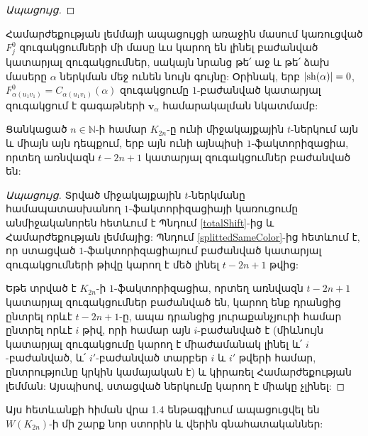 \begin{hide}
\begin{proof}[Ապացույց]
\end{proof}

\begin{remark}\label{splittedSameColor}
Համարժեքության լեմմայի ապացույցի առաջին մասում կառուցված $F_j^0$ զուգակցումների մի մասը ևս կարող են լինել բաժանված կատարյալ զուգակցումներ, սակայն նրանց թե՛ աջ և թե՛ ձախ մասերը $\alpha$ ներկման մեջ ունեն նույն գույնը: Օրինակ, երբ $|{\rm sh}(\alpha)|=0$, $F^0_{\alpha(u_1v_1)} = C_{\alpha(u_1v_1)}(\alpha)$ զուգակցումը $1$-բաժանված կատարյալ զուգակցում է գագաթների $\mathbf{v}_\alpha$ համարակալման նկատմամբ:
\end{remark}
\end{hide}

\begin{corollary}\label{cEquiv}
Ցանկացած $n\in\mathbb{N}$-ի համար $K_{2n}$-ը ունի միջակայքային $t$-ներկում այն և միայն այն դեպքում, երբ այն ունի այնպիսի $1$-ֆակտորիզացիա, որտեղ առնվազն $t-2n+1$ կատարյալ զուգակցումներ բաժանված են:
\end{corollary}
\begin{proof}[Ապացույց]
Տրված միջակայքային $t$-ներկմանը համապատասխանող $1$-ֆակտորիզացիայի կառուցումը անմիջականորեն հետևում է Պնդում \ref{totalShift}-ից և Համարժեքության լեմմայից: Պնդում \ref{splittedSameColor}-ից հետևում է, որ ստացված $1$-ֆակտորիզացիայում բաժանված կատարյալ զուգակցումների թիվը կարող է մեծ լինել $t-2n+1$ թվից:

Եթե տրված է $K_{2n}$-ի $1$-ֆակտորիզացիա, որտեղ առնվազն $t-2n+1$ կատարյալ զուգակցումներ բաժանված են, կարող ենք դրանցից ընտրել որևէ $t-2n+1$-ը, ապա դրանցից յուրաքանչյուրի համար ընտրել որևէ $i$ թիվ, որի համար այն $i$-բաժանված է (միևնույն կատարյալ զուգակցումը կարող է միաժամանակ լինել և՛ $i$-բաժանված, և՛ $i'$-բաժանված տարբեր $i$ և $i'$ թվերի համար, ընտրությունը կրկին կամայական է) և կիրառել Համարժեքության լեմման: Այսպիսով, ստացված ներկումը կարող է միակը չլինել:
\end{proof}

Այս հետևանքի հիման վրա 1.4 ենթագլխում ապացուցվել են $W(K_{2n})$-ի մի շարք նոր ստորին և վերին գնահատականներ:
